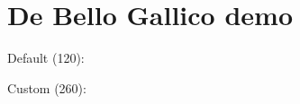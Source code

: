 \documentclass{article}
\begin{document}
\section*{De Bello Gallico demo}
Default (120): \DeBelloGallico

\bigskip
Custom (260): \DeBelloGallico[260]
\end{document}
